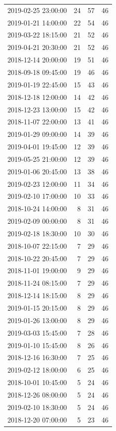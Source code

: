 \begin{tabular}{lrrr}
2019-02-25 23:00:00 & 24 & 57 & 46 \\
2019-01-21 14:00:00 & 22 & 54 & 46 \\
2019-03-22 18:15:00 & 21 & 52 & 46 \\
2019-04-21 20:30:00 & 21 & 52 & 46 \\
2018-12-14 20:00:00 & 19 & 51 & 46 \\
2018-09-18 09:45:00 & 19 & 46 & 46 \\
2019-01-19 22:45:00 & 15 & 43 & 46 \\
2018-12-18 12:00:00 & 14 & 42 & 46 \\
2018-12-23 13:00:00 & 15 & 42 & 46 \\
2018-11-07 22:00:00 & 13 & 41 & 46 \\
2019-01-29 09:00:00 & 14 & 39 & 46 \\
2019-04-01 19:45:00 & 12 & 39 & 46 \\
2019-05-25 21:00:00 & 12 & 39 & 46 \\
2019-01-06 20:45:00 & 13 & 38 & 46 \\
2019-02-23 12:00:00 & 11 & 34 & 46 \\
2019-02-10 17:00:00 & 10 & 33 & 46 \\
2018-10-24 14:00:00 & 8 & 31 & 46 \\
2019-02-09 00:00:00 & 8 & 31 & 46 \\
2019-02-18 18:30:00 & 10 & 30 & 46 \\
2018-10-07 22:15:00 & 7 & 29 & 46 \\
2018-10-22 20:45:00 & 7 & 29 & 46 \\
2018-11-01 19:00:00 & 9 & 29 & 46 \\
2018-11-24 08:15:00 & 7 & 29 & 46 \\
2018-12-14 18:15:00 & 8 & 29 & 46 \\
2019-01-15 20:15:00 & 8 & 29 & 46 \\
2019-01-26 13:00:00 & 8 & 29 & 46 \\
2019-03-03 15:45:00 & 7 & 28 & 46 \\
2019-01-10 15:45:00 & 8 & 26 & 46 \\
2018-12-16 16:30:00 & 7 & 25 & 46 \\
2019-02-12 18:00:00 & 6 & 25 & 46 \\
2018-10-01 10:45:00 & 5 & 24 & 46 \\
2018-12-26 08:00:00 & 5 & 24 & 46 \\
2019-02-10 18:30:00 & 5 & 24 & 46 \\
2018-12-20 07:00:00 & 5 & 23 & 46 \\

\end{tabular}
